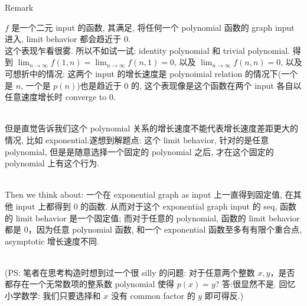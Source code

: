 \begin{qlremark}{Remark}

\(f\) 是一个二元 input 的函数, 其满足, 将任何一个 polynomial 函数的 graph input 进入, limit behavior 都会趋近于 0.\\
这个表现乍看很雾. 所以不如试一试: identity polynomial 和 trivial polynomial. 得到 \(\lim_{n\rightarrow\infty}f(1,n) = \lim_{n\rightarrow\infty}f(n,1) = 0\), 以及 \(\lim_{n\rightarrow\infty}f(n,n) = 0\), 以及可想折中的情况: 这两个 input 的增长速度是 polynoimial relation 的情况下(一个是 \(n\), 一个是 \(p(n)\))也是趋近于 0 的, 这个表现像是这个函数在两个 input 各自以任意速度增长时 converge to 0.\\
\strut \\
但是直觉告诉我们这个 polynomial 关系的增长速度不能代表增长速度差距更大的情况, 比如 exponential.遂想到解题点: 这个 limit behavior, 针对的是任意 polynomial, 但是是随意选择一个固定的 polynomial 之后, 才在这个固定的 polynomial 上有这个行为.\\
\strut \\
Then we think about: 一个在 exponential graph as input 上一直得到固定值, 在其他 input 上都得到 0 的函数. 从而对于这个 exponential graph input 的 seq, 函数的 limit behavior 是一个固定值; 而对于任意的 polynomial, 函数的 limit behavior 都是 0，因为任意 polynomial 函数, 和一个 exponential 函数至多有有限个重合点, asymptotic 增长速度不同.\\
\strut \\
(PS: 笔者在思考构造时想到过一个很 silly 的问题: 对于任意两个整数 \(x,y\)，是否都存在一个无常数项的整系数 polynomial 使得 \(p(x) = y\)? 答:很显然不是. 回忆小学数学: 我们只要选择和 \(x\) 没有 common factor 的 \(y\) 即可得反.)

\end{qlremark}
